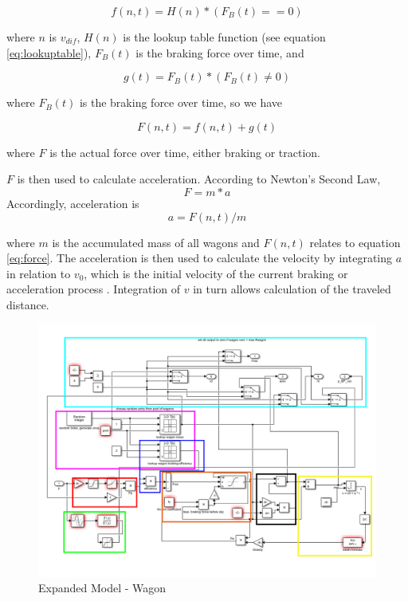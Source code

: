 \begin{equation}
\label{eq:tracforce}
f(n,t) = H(n) * (F_{B}(t) == 0) 
\end{equation}

\noindent
where $n$ is $v_{dif}$, $H(n)$ is the lookup table function (see equation \ref{eq:lookuptable}), $F_{B}(t)$ is the braking force over time, and 

\begin{equation}
\label{eq:brakeforce}
g(t) = F_{B}(t) * (F_{B}(t) \neq 0)
\end{equation}

\noindent
where $F_{B}(t)$ is the braking force over time, so we have 

\begin{equation}
\label{eq:force}
F(n,t) = f(n,t) + g(t) 
\end{equation} 

\noindent
where $F$ is the actual force over time, either braking or traction.

\par\noindent
$F$ is then used to calculate acceleration. According to Newton's Second Law,
\begin{equation}
\label{eq:newton}
F = m * a
\end{equation}
Accordingly, acceleration is
\begin{equation}
\label{eq:acceleration}
a = F(n,t) / m
\end{equation}
	
\noindent
where $m$ is the accumulated mass of all wagons and $F(n,t)$ relates to equation \ref{eq:force}. The acceleration is then used to calculate the velocity by integrating $a$ in relation to $v_{0}$, which is the initial velocity of the current braking or acceleration process . Integration of $v$ in turn allows calculation of the traveled distance.

\begin{figure}[H]
	\centering
	\includegraphics[width=\linewidth]{./pic/expandedmodel_wagon}
	\caption{Expanded Model - Wagon}
	\label{fig:expandedmodel_wagon}
\end{figure}

